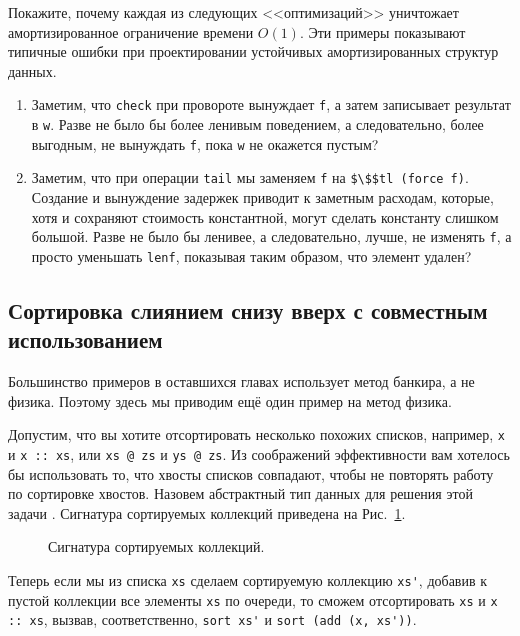 \begin{exercise}\label{ex:6.6}
  Покажите, почему каждая из следующих <<оптимизаций>> уничтожает
  амортизированное ограничение времени $O(1)$. Эти примеры показывают
  типичные ошибки при проектировании устойчивых амортизированных
  структур данных.
  \begin{enumerate}
  \item Заметим, что \lstinline!check! при провороте вынуждает
    \lstinline!f!, а затем записывает результат в \lstinline!w!. Разве не
    было бы более ленивым поведением, а следовательно, более выгодным,
    не вынуждать \lstinline!f!, пока \lstinline!w! не окажется пустым?
  \item Заметим, что при операции \lstinline!tail! мы заменяем
    \lstinline!f! на \lstinline!$\$$tl (force f)!. Создание и
    вынуждение задержек приводит к заметным расходам, которые, хотя и
    сохраняют стоимость константной, могут сделать константу слишком
    большой. Разве не было бы ленивее, а следовательно, лучше, не изменять
    \lstinline!f!, а просто уменьшать \lstinline!lenf!, показывая
    таким образом, что элемент удален?
  \end{enumerate}
\end{exercise}

\subsection{Сортировка слиянием снизу вверх с совместным
  использованием}
\label{sc:6.4.3}

Большинство примеров в оставшихся главах использует метод банкира, а
не физика. Поэтому здесь мы приводим ещё один пример на метод физика.

Допустим, что вы хотите отсортировать несколько похожих списков,
например, \lstinline!x! и \lstinline!x :: xs!, или \lstinline!xs @ zs! и
\lstinline!ys @ zs!. Из соображений эффективности вам хотелось бы
использовать то, что хвосты списков совпадают, чтобы не повторять
работу по сортировке хвостов.  Назовем абстрактный тип данных для
решения этой задачи . Сигнатура сортируемых коллекций приведена на
Рис.~\ref{fig:6.4}.

\begin{figure}
  \centering
  
  \caption{Сигнатура сортируемых коллекций.}
  \label{fig:6.4}
\end{figure}

Теперь если мы из списка \lstinline!xs! сделаем сортируемую коллекцию
\lstinline!xs'!, добавив к пустой коллекции все элементы
\lstinline!xs! по очереди, то сможем отсортировать \lstinline!xs! и
\lstinline!x :: xs!, вызвав, соответственно, \lstinline!sort xs'! и
\lstinline!sort (add (x, xs'))!.


